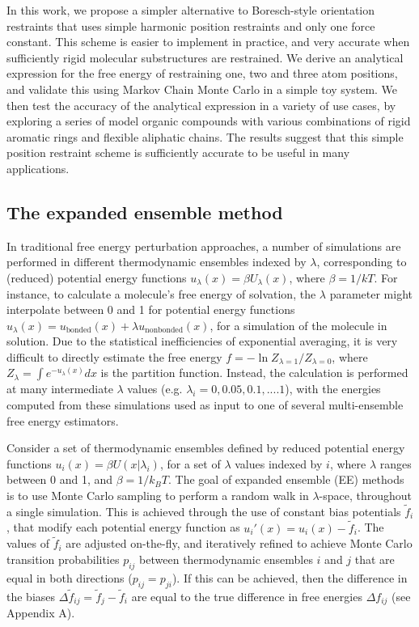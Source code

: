 \documentclass[%
 aip,
 rsi,
 jmp,%
 amsmath,amssymb,
 reprint,%
]{revtex4-1}
\begin{document}
In this work, we propose a simpler alternative to Boresch-style orientation restraints that uses simple harmonic position restraints and only one force constant.  This scheme is easier to implement in practice, and very accurate when sufficiently rigid molecular substructures are restrained.  We derive an analytical expression for the free energy of restraining one, two and three atom positions, and validate this using Markov Chain Monte Carlo in a simple toy system.  We then test the accuracy of the analytical expression in a variety of use cases, by exploring a series of model organic compounds with various combinations of rigid aromatic rings and flexible aliphatic chains.   The results suggest that this simple position restraint scheme is sufficiently accurate to be useful in many applications.




\subsection*{The expanded ensemble method}

In traditional free energy perturbation approaches, a number of simulations are performed in different thermodynamic ensembles indexed by $\lambda$, corresponding to (reduced) potential energy functions $u_{\lambda}(x) = \beta U_{\lambda}(x)$, where $\beta = 1/kT$.  For instance, to calculate a molecule's free energy of solvation, the $\lambda$ parameter might interpolate between 0 and 1 for potential energy functions $u_{\lambda}(x) = u_{\text{bonded}}(x) + \lambda u_{\text{nonbonded}}(x)$, for a simulation of the molecule in solution.  Due to the statistical inefficiencies of exponential averaging, it is very difficult to directly estimate the free energy $f = -\ln Z_{\lambda=1}/Z_{\lambda=0}$, where $Z_{\lambda} = \int e^{-u_{\lambda}(x)} dx$ is the partition function.  Instead,  the calculation is performed at many intermediate $\lambda$ values (e.g. $\lambda_i = 0, 0.05, 0.1, .... 1$), with the energies computed from these simulations used as input to one of several multi-ensemble free energy estimators.\cite{shirts2008statistically,TI} 

Consider a set of thermodynamic ensembles defined by reduced potential energy functions $u_i(x) = \beta U(x|\lambda_i)$, for a set of $\lambda$ values indexed by $i$, where $\lambda$ ranges between 0 and 1, and $\beta = 1/k_BT$.  The goal of expanded ensemble (EE) methods is to use Monte Carlo sampling to perform a random walk in $\lambda$-space, throughout a single simulation.  This is achieved through the use of constant bias potentials $\tilde{f}_i$, that modify each potential energy function as $u_i'(x) = u_i(x) - \tilde{f}_i$. The values of $\tilde{f}_i$ are adjusted on-the-fly, and iteratively refined to achieve Monte Carlo transition probabilities $p_{ij}$ between thermodynamic ensembles $i$ and $j$ that are equal in both directions ($p_{ij} = p_{ji}$).  If this can be achieved, then the difference in the biases $\Delta \tilde{f}_{ij} = \tilde{f}_j - \tilde{f}_i$ are equal to the true difference in free energies $\Delta f_{ij}$ (see Appendix A).
\end{document}
